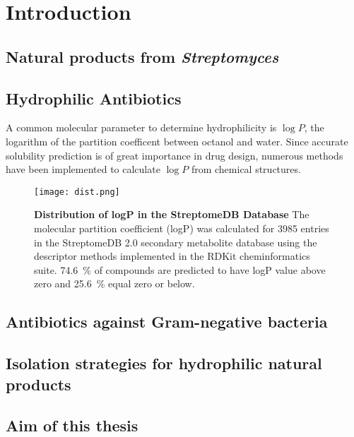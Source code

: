 \chapter{Introduction}

\section{Natural products from \textit{Streptomyces}} %
\label{sec:natural_products_from_it}


\section{Hydrophilic Antibiotics} %
\label{sec:hydrophilic_antibiotics}

A common molecular parameter to determine hydrophilicity is $\log P$, the logarithm of the partition coefficent between octanol and water\autocite{Leo1971}.
Since accurate solubility prediction is of great importance in drug design, numerous methods have been implemented to calculate $\log P$ from chemical structures.\autocite{Eros2002,VandeWaterbeemd1996,Mannhold2009}

\begin{figure}[htbp]
	\centering
	\texttt{[image: dist.png]}
	\caption[Distribution of logP in the StreptomeDB Database]{%
		\textbf{Distribution of logP in the StreptomeDB Database}
		The molecular partition coefficient (logP) was calculated for 3985 entries in the StreptomeDB 2.0 secondary metabolite database\autocite{Klementz2016} using the descriptor methods implemented in the RDKit cheminformatics suite\autocite{Wildman1999}.
		74.6~\%  of compounds are predicted to have logP value above zero and 25.6~\% equal zero or below.
	}
	\label{fig:logp_dist}
\end{figure}


\section{Antibiotics against Gram-negative bacteria} %
\label{sec:antibiotics_against_gram_negative_bacteria}


\section{Isolation strategies for hydrophilic natural products} %
\label{sec:isolation_strategies_for_hydrophilic_natural_products}


\section{Aim of this thesis} %
\label{sec:aim_of_this_thesis}

